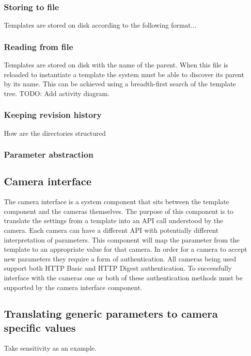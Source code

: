 \subsubsection{Storing to file} %
Templates are stored on disk according to the following format...

\subsubsection{Reading from file}
Templates are stored on disk with the name of the parent. When this file is reloaded to instantiate a template the system must be able to discover its
parent by its name. This can be achieved using a breadth-first search of the template tree.
TODO: Add activity diagram.

\subsubsection{Keeping revision history}
How are the directories structured

\subsubsection{Parameter abstraction}


\subsection{Camera interface}
The camera interface is a system component that sits between the template component and the cameras themselves. The purpose of this component
is to translate the settings from a template into an API call understood by the camera. Each camera can have a different API with potentially different interpretation of parameters. This component will map the parameter from the template to an appropriate value for that camera.
In order for a camera to accept new parameters they require a form of authentication. All cameras being used support both HTTP Basic and HTTP Digest authentication.
To successfully interface with the cameras one or both of these authentication methods must be supported by the camera interface component.

\subsection{Translating generic parameters to camera specific values}
Take sensitivity as an example.

